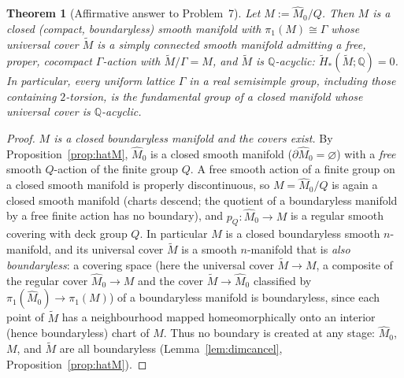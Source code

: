 \documentclass[12pt]{article}
\newtheorem{theorem}{Theorem}
\theoremstyle{definition}
\begin{document}
\begin{theorem}[Affirmative answer to Problem~7]\label{thm:main}
Let $M:=\widehat M_0/Q$. Then $M$ is a closed (compact, boundaryless) smooth
manifold with $\pi_1(M)\cong\Gamma$ whose universal cover $\widetilde M$ is a
\emph{simply connected} smooth manifold admitting a free, proper, cocompact
$\Gamma$-action with $\widetilde M/\Gamma=M$, and $\widetilde M$ is
$\mathbb{Q}$-acyclic: $\widetilde H_*(\widetilde M;\mathbb{Q})=0$. In particular,
every uniform lattice $\Gamma$ in a real semisimple group, including those
containing $2$-torsion, \emph{is} the fundamental group of a closed manifold
whose universal cover is $\mathbb{Q}$-acyclic.
\end{theorem}
\begin{proof}
\emph{$M$ is a closed boundaryless manifold and the covers exist.} By
Proposition~\ref{prop:hatM}, $\widehat M_0$ is a closed smooth manifold
($\partial\widehat M_0=\varnothing$) with a \emph{free} smooth $Q$-action of the
finite group $Q$. A free smooth action of a finite group on a closed smooth
manifold is properly discontinuous, so $M=\widehat M_0/Q$ is again a closed
smooth manifold (charts descend; the quotient of a boundaryless manifold by a
free finite action has no boundary), and $p_Q\colon\widehat M_0\to M$ is a
regular smooth covering with deck group $Q$. In particular $M$ is a closed
boundaryless smooth $n$-manifold, and its universal cover $\widetilde M$ is a
smooth $n$-manifold that is \emph{also boundaryless}: a covering space (here the
universal cover $\widetilde M\to M$, a composite of the regular cover
$\widehat M_0\to M$ and the cover $\widetilde M\to\widehat M_0$ classified by
$\pi_1(\widehat M_0)\to\pi_1(M)$) of a boundaryless manifold is boundaryless,
since each point of $\widetilde M$ has a neighbourhood mapped homeomorphically
onto an interior (hence boundaryless) chart of $M$. Thus no boundary is created
at any stage: $\widehat M_0$, $M$, and $\widetilde M$ are all boundaryless
(Lemma~\ref{lem:dimcancel}, Proposition~\ref{prop:hatM}).


\end{proof}
\end{document}
